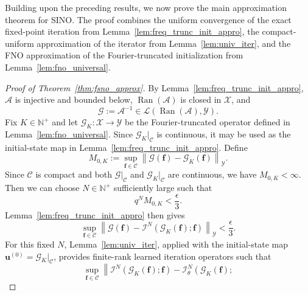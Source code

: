 \documentclass[preprint,numbers,sort&compress]{elsarticle}
\begin{document}
			Building upon the preceding results, we now prove the main approximation theorem for SINO. The proof combines the uniform convergence of the exact fixed-point iteration from
			Lemma~\ref{lem:freq_trunc_init_appro}, the compact-uniform approximation of the iterator from Lemma~\ref{lem:univ_iter}, and the FNO approximation of the Fourier-truncated initialization from
			Lemma~\ref{lem:fno_universal}.
			
			\begin{proof}[Proof of Theorem~\ref{thm:fsno_approx}]
				By Lemma~\ref{lem:freq_trunc_init_appro},
				$\mathcal A$ is injective and bounded below,
				$\operatorname{Ran}(\mathcal A)$ is closed in $\mathcal X$, and
				\[
				\mathcal G:=\mathcal A^{-1}
				\in
				\mathcal L
				\left(
				\operatorname{Ran}(\mathcal A),
				\mathcal Y
				\right).
				\]
				Fix $K\in\mathbb N^+$ and let
				$\mathcal G_K:\mathcal X\to\mathcal Y$
				be the Fourier-truncated operator defined in
				Lemma~\ref{lem:fno_universal}.
				Since $\mathcal G_K|_{\mathcal C}$ is continuous, it may be used as
				the initial-state map in
				Lemma~\ref{lem:freq_trunc_init_appro}. Define
				\[
				M_{0,K}
				:=
				\sup_{\boldsymbol f\in\mathcal C}
				\left\|
				\mathcal G(\boldsymbol f)
				-
				\mathcal G_K(\boldsymbol f)
				\right\|_{\mathcal Y}.
				\]
				Since $\mathcal C$ is compact and both
				$\mathcal G|_{\mathcal C}$ and $\mathcal G_K|_{\mathcal C}$
				are continuous, we have $M_{0,K}<\infty$.
				Then we can choose $N\in\mathbb N^+$ sufficiently large such that
				\[
				q^N M_{0,K}
				<
				\frac{\epsilon}{3}.
				\]
				Lemma~\ref{lem:freq_trunc_init_appro} then gives
				\begin{equation}
					\label{eq:proof_error_I}
					\sup_{\boldsymbol f\in\mathcal C}
					\left\|
					\mathcal G(\boldsymbol f)
					-
					\mathcal I^N
					\left(
					\mathcal G_K(\boldsymbol f);
					\boldsymbol f
					\right)
					\right\|_{\mathcal Y}
					<
					\frac{\epsilon}{3}.
				\end{equation}
				For this fixed $N$, Lemma~\ref{lem:univ_iter}, applied with the
				initial-state map
				$\boldsymbol u^{(0)}=\mathcal G_K|_{\mathcal C}$,
				provides finite-rank learned iteration operators such that
				\begin{equation}
					\label{eq:proof_error_II}
					\sup_{\boldsymbol f\in\mathcal C}
					\left\|
					\mathcal I^N
					\left(
					\mathcal G_K(\boldsymbol f);
					\boldsymbol f
					\right)
					-
					\mathcal I_\theta^N
					\left(
					\mathcal G_K(\boldsymbol f);

\end{equation}
\end{proof}
\end{document}
